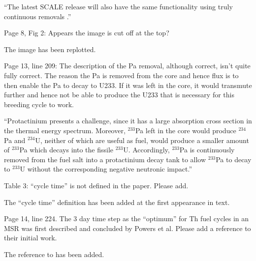 \documentclass[answers,11pt]{exam}
\begin{document}
\begin{questions}
\begin{solution}
		        ``The latest SCALE release will also have the same functionality using 
        		truly continuous removals \cite{betzler_implementation_2017}.''
        \end{solution}

        \question  Page 8, Fig 2: Appears the image is cut off at the top?
        \begin{solution}
        		The image has been replotted.
        \end{solution}

        \question  Page 13, line 209: The description of the Pa removal, 
        although correct, isn't quite fully correct. The reason the Pa is 
        removed from the core and hence flux is to then enable the Pa to decay 
        to U233. If it was left in the core, it would transmute further and 
        hence not be able to produce the U233 that is necessary for this 
        breeding cycle to work.
        \begin{solution}
        		``Protactinium presents a challenge, since it has a large absorption cross 
				section in the thermal energy spectrum. Moreover, $^{233}$Pa left in the core
				 would produce $^{234}$Pa and $^{234}$U, neither of which are useful as fuel, 
				 would produce a smaller amount of $^{233}$Pa which decays into the fissile $^{233}$U.
				Accordingly, $^{233}$Pa is continuously removed from the fuel salt into 
				a protactinium decay tank to allow $^{233}$Pa to decay to $^{233}$U 
				without the corresponding negative neutronic impact.''
        \end{solution}

        \question  Table 3: ``cycle time'' is not defined in the paper. Please 
        add.
        \begin{solution}
                        The ``cycle time'' definition has been added at the first 
                        appearance in text. 
        \end{solution}

        \question  Page 14, line 224. The 3 day time step as the ``optimum'' for 
        Th fuel cycles in an MSR was first described and concluded by Powers et 
        al. Please add a reference to their initial work.
        \begin{solution}
        		The reference to \cite{powers_new_2013} has been added.
        \end{solution}


\end{questions}
\end{document}

